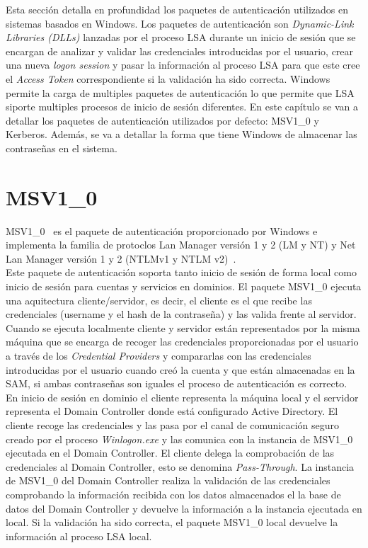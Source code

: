 Esta sección detalla en profundidad los paquetes de autenticación utilizados en sistemas basados en Windows. Los paquetes de autenticación son {\it Dynamic-Link Libraries (DLLs)} lanzadas por el proceso LSA durante un inicio de sesión que se encargan de analizar y validar las credenciales introducidas por el usuario, crear una nueva {\it logon session} y pasar la información al proceso LSA para que este cree el {\it Access Token} correspondiente si la validación ha sido correcta. Windows permite la carga de multiples paquetes de autenticación lo que permite que LSA siporte multiples procesos de inicio de sesión diferentes. En este capítulo se van a detallar los paquetes de autenticación utilizados por defecto: MSV1\_0 y Kerberos. Además, se va a detallar la forma que tiene Windows de almacenar las contraseñas en el sistema.

\section{MSV1\_0}

MSV1\_0~\cite{Capitulo3:MSV10} es el paquete de autenticación proporcionado por Windows e implementa la familia de protoclos Lan Manager versión 1 y 2 (LM y NT) y Net Lan Manager versión 1 y 2 (NTLMv1 y NTLM v2)~\cite{Capitulo3:NTLM}. \\

Este paquete de autenticación soporta tanto inicio de sesión de forma local como inicio de sesión para cuentas y servicios en dominios. El paquete MSV1\_0 ejecuta una aquitectura cliente/servidor, es decir, el cliente es el que recibe las credenciales (username y el hash de la contraseña) y las valida frente al servidor. \\

Cuando se ejecuta localmente cliente y servidor están representados por la misma máquina que se encarga de recoger las credenciales proporcionadas por el usuario a través de los {\it Credential Providers} y compararlas con las credenciales introducidas por el usuario cuando creó la cuenta y que están almacenadas en la SAM, si ambas contraseñas son iguales el proceso de autenticación es correcto. \\

En inicio de sesión en dominio el cliente representa la máquina local y el servidor representa el Domain Controller donde está configurado Active Directory. El cliente recoge las credenciales y las pasa por el canal de comunicación seguro creado por el proceso {\it Winlogon.exe} y las comunica con la instancia de MSV1\_0 ejecutada en el Domain Controller. El cliente delega la comprobación de las credenciales al Domain Controller, esto se denomina {\it Pass-Through}. La instancia de MSV1\_0 del Domain Controller realiza la validación de las credenciales comprobando la información recibida con los datos almacenados el la base de datos del Domain Controller y devuelve la información a la instancia ejecutada en local. Si la validación ha sido correcta, el paquete MSV1\_0 local devuelve la información al proceso LSA local. \\

